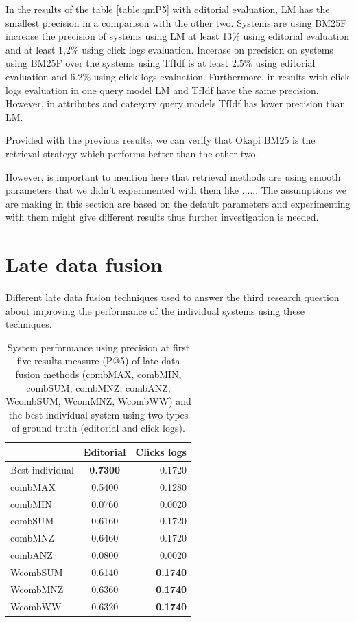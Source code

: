  In the results of the table \ref{table:qmP5} with editorial evaluation, LM has the smallest precision in a comparison with the other two. Systems are using BM25F increase the precision of systems using LM at least 13\% using editorial evaluation and at least 1,2\% using click logs evaluation. Incerase on precision on systems using BM25F over the systems using TfIdf is at least 2.5\% using editorial evaluation and 6.2\% using click logs evaluation.
 Furthermore, in results with click logs evaluation in one query model LM and TfIdf have the same precision. However, in attributes and category query models TfIdf has lower precision than LM.


Provided with the previous results, we can verify that Okapi BM25 is the retrieval strategy which performs better than the other two.


 However, is important to mention here that retrieval methods are using smooth parameters that we didn't experimented with them like ...... The assumptions we are making in this section are based on the default parameters and experimenting with them might give different results thus further investigation is needed.


\section{Late data fusion}

Different late data fusion techniques used to answer the third research question about improving the performance of the individual systems using these techniques.

\begin{table}[H]
\begin{center}
\footnotesize
\caption{System performance using precision at first five results measure (P@5) of late data fusion methods (combMAX, combMIN, combSUM, combMNZ, combANZ, WcombSUM, WcomMNZ, WcombWW) and the best individual system using two types of ground truth (editorial and click logs).}
\label{table:ldfP5}

\begin{tabular}{lcr}
\midrule
  & Editorial & Clicks logs\\
 \midrule
 	Best individual & \textbf{0.7300} & 0.1720 \\
	combMAX & 0.5400 & 0.1280\\
	combMIN & 0.0760 & 0.0020 \\
	combSUM & 0.6160 & 0.1720 \\
	combMNZ & 0.6460 & 0.1720 \\
	combANZ & 0.0800 & 0.0020 \\
	WcombSUM & 0.6140 & \textbf{0.1740} \\
	WcombMNZ & 0.6360 & \textbf{0.1740} \\
	WcombWW & 0.6320 & \textbf{0.1740} \\
\bottomrule
\end{tabular}
\end{center}
\end{table}



